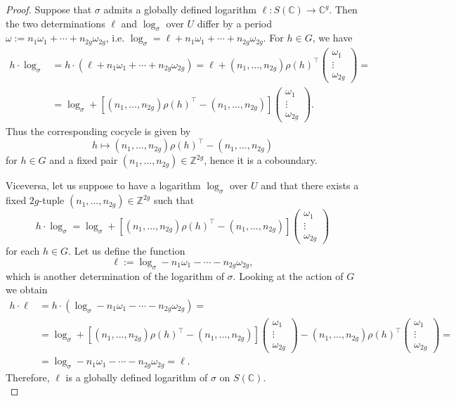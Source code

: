 \documentclass[10 pt,a4paper]{article}
\theoremstyle{plain}
\theoremstyle{definition}
\theoremstyle{named}
\newcommand{\bC}{\mathbb C}
\newcommand{\bZ}{\mathbb Z}
\begin{document}
\begin{proof}
	Suppose that $\sigma$ admits a globally defined logarithm $\ell:S(\bC) \rightarrow \bC^g$. Then the two determinations $\ell$ and $\log_\sigma$ over $U$ differ by a period $\omega:=n_1\omega_1+\cdots+n_{2g}\omega_{2g}$, i.e. $\log_\sigma=\ell + n_1\omega_1 + \cdots + n_{2g}\omega_{2g}$. For $h \in G$, we have
	\begin{align*}
		h\cdot\log_\sigma &= h\cdot (\ell + n_1\omega_1 + \cdots + n_{2g}\omega_{2g}) = \ell + (n_1,\ldots,n_{2g})\rho(h)^\top\left(\begin{matrix} \omega_1 \\ \vdots \\ \omega_{2g}\end{matrix}\right)=\\
		&= \log_\sigma + \left[(n_1,\ldots,n_{2g})\rho(h)^\top-(n_1,\ldots,n_{2g})\right] \left(\begin{matrix} \omega_1 \\ \vdots \\ \omega_{2g}\end{matrix}\right).
	\end{align*}
	Thus the corresponding cocycle is given by
	\[
    h\mapsto (n_1,\ldots,n_{2g})\rho(h)^\top-(n_1,\ldots,n_{2g})
    \]
	for $h \in G$ and a fixed pair $(n_1,\ldots,n_{2g}) \in \bZ^{2g}$, hence it is a coboundary.
	
	Viceversa, let us suppose to have a logarithm $\log_\sigma$ over $U$ and that there exists a fixed $2g$-tuple $(n_1,\ldots,n_{2g}) \in \bZ^{2g}$ such that
	\[
    h\cdot\log_\sigma = \log_\sigma + \left[(n_1,\ldots,n_{2g})\rho(h)^\top-(n_1,\ldots,n_{2g})\right] \left(\begin{matrix} \omega_1 \\ \vdots \\ \omega_{2g}\end{matrix}\right)
    \]
	for each $h \in G$. Let us define the function
	\[
    \ell:=\log_\sigma - n_1\omega_1 -\cdots- n_{2g} \omega_{2g},
    \]
	which is another determination of the logarithm of $\sigma$. Looking at the action of $G$ we obtain
	\begin{align*}
		h\cdot \ell &= h\cdot(\log_\sigma - n_1\omega_1 - \cdots - n_{2g} \omega_{2g}) =\\
		&=\log_\sigma + \left[(n_1,\ldots,n_{2g})\rho(h)^\top-(n_1,\ldots,n_{2g})\right] \left(\begin{matrix} \omega_1 \\ \vdots \\ \omega_{2g}\end{matrix}\right) - (n_1,\ldots,n_{2g})\rho(h)^\top \left(\begin{matrix} \omega_1 \\ \vdots \\ \omega_{2g}\end{matrix}\right)=\\
		&= \log_\sigma - n_1\omega_1 - \cdots - n_{2g} \omega_{2g} =\ell.
	\end{align*}
	Therefore, $\ell$ is a globally defined logarithm of $\sigma$ on $S(\bC)$.\\
\end{proof}
\end{document}

